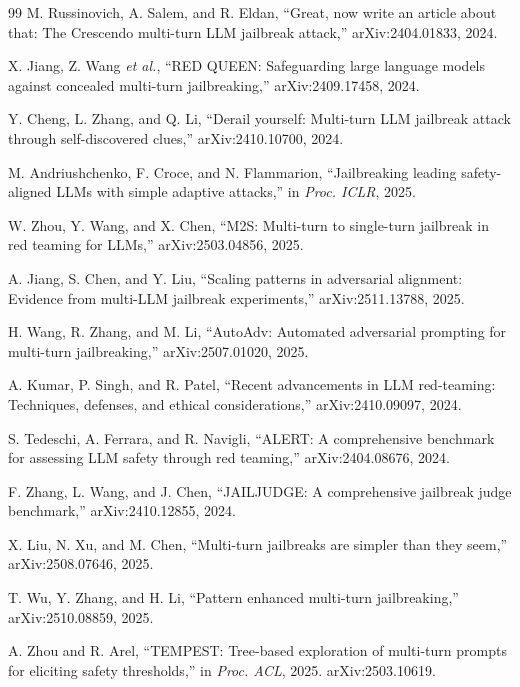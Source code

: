 \documentclass[11pt,a4paper]{article}
\begin{document}
\begin{thebibliography}{99}
M. Russinovich, A. Salem, and R. Eldan, ``Great, now write an article about that: The Crescendo multi-turn LLM jailbreak attack,'' arXiv:2404.01833, 2024.

X. Jiang, Z. Wang \textit{et al.}, ``RED QUEEN: Safeguarding large language models against concealed multi-turn jailbreaking,'' arXiv:2409.17458, 2024.

Y. Cheng, L. Zhang, and Q. Li, ``Derail yourself: Multi-turn LLM jailbreak attack through self-discovered clues,'' arXiv:2410.10700, 2024.

M. Andriushchenko, F. Croce, and N. Flammarion, ``Jailbreaking leading safety-aligned LLMs with simple adaptive attacks,'' in \textit{Proc. ICLR}, 2025.

W. Zhou, Y. Wang, and X. Chen, ``M2S: Multi-turn to single-turn jailbreak in red teaming for LLMs,'' arXiv:2503.04856, 2025.

A. Jiang, S. Chen, and Y. Liu, ``Scaling patterns in adversarial alignment: Evidence from multi-LLM jailbreak experiments,'' arXiv:2511.13788, 2025.

H. Wang, R. Zhang, and M. Li, ``AutoAdv: Automated adversarial prompting for multi-turn jailbreaking,'' arXiv:2507.01020, 2025.

A. Kumar, P. Singh, and R. Patel, ``Recent advancements in LLM red-teaming: Techniques, defenses, and ethical considerations,'' arXiv:2410.09097, 2024.

S. Tedeschi, A. Ferrara, and R. Navigli, ``ALERT: A comprehensive benchmark for assessing LLM safety through red teaming,'' arXiv:2404.08676, 2024.

F. Zhang, L. Wang, and J. Chen, ``JAILJUDGE: A comprehensive jailbreak judge benchmark,'' arXiv:2410.12855, 2024.

X. Liu, N. Xu, and M. Chen, ``Multi-turn jailbreaks are simpler than they seem,'' arXiv:2508.07646, 2025.

T. Wu, Y. Zhang, and H. Li, ``Pattern enhanced multi-turn jailbreaking,'' arXiv:2510.08859, 2025.

A. Zhou and R. Arel, ``TEMPEST: Tree-based exploration of multi-turn prompts for eliciting safety thresholds,'' in \textit{Proc. ACL}, 2025. arXiv:2503.10619.


\end{thebibliography}
\end{document}
